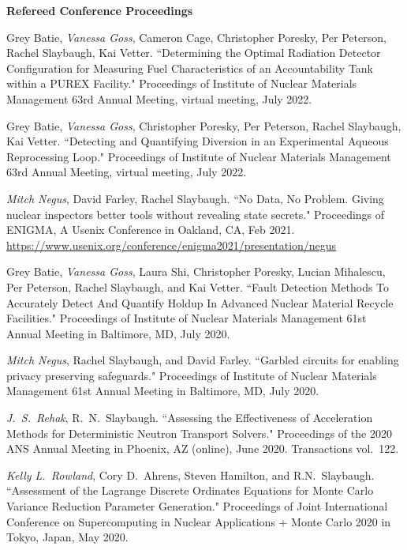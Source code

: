 \begin{bibsection}
\item \textbf{Refereed Conference Proceedings}
\item Grey Batie, \textit{Vanessa Goss}, Cameron Cage, Christopher Poresky, Per Peterson, Rachel Slaybaugh, Kai Vetter. ``Determining the Optimal Radiation Detector Configuration for Measuring Fuel Characteristics of an Accountability Tank within a PUREX Facility." Proceedings of Institute of Nuclear Materials Management 63rd Annual Meeting, virtual meeting, July 2022.

\item Grey Batie, \textit{Vanessa Goss}, Christopher Poresky, Per Peterson, Rachel Slaybaugh, Kai Vetter. ``Detecting and Quantifying Diversion in an Experimental Aqueous Reprocessing Loop." Proceedings of Institute of Nuclear Materials Management 63rd Annual Meeting, virtual meeting, July 2022.

\item \textit{Mitch Negus}, David Farley, Rachel Slaybaugh. ``No Data, No Problem. Giving
nuclear inspectors better tools without revealing state secrets." Proceedings of
ENIGMA, A Usenix Conference in Oakland, CA, Feb 2021.\\
\url{https://www.usenix.org/conference/enigma2021/presentation/negus}

\item Grey Batie, \textit{Vanessa Goss}, Laura Shi, Christopher Poresky, Lucian
Mihalescu, Per Peterson, Rachel Slaybaugh, and Kai Vetter. ``Fault Detection Methods To Accurately Detect And Quantify Holdup In Advanced Nuclear Material Recycle Facilities."  Proceedings of Institute of Nuclear Materials Management 61st Annual Meeting in Baltimore, MD, July 2020.

\item \textit{Mitch Negus}, Rachel Slaybaugh, and David Farley. ``Garbled
circuits for enabling privacy preserving safeguards." Proceedings of Institute
of Nuclear Materials Management 61st Annual Meeting in Baltimore, MD, July 2020.

\item \textit{J.\ S.\ Rehak}, R.\ N.\ Slaybaugh. ``Assessing the Effectiveness
of Acceleration Methods for Deterministic Neutron Transport Solvers."
Proceedings of  the 2020 ANS Annual Meeting in Phoenix, AZ (online), June 2020.
Transactions vol.\ 122.

\item \textit{Kelly L.\ Rowland}, Cory D.\ Ahrens, Steven Hamilton, and R.N.\
Slaybaugh. ``Assessment of the Lagrange Discrete Ordinates Equations for Monte
Carlo Variance Reduction Parameter Generation." Proceedings of Joint
International Conference on Supercomputing in Nuclear Applications + Monte Carlo
2020 in Tokyo, Japan, May 2020. 


\end{bibsection}
